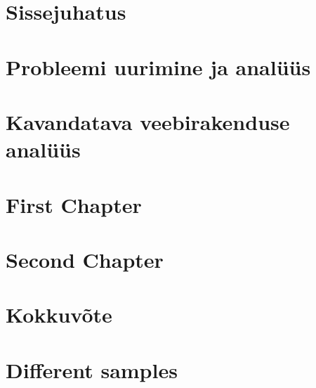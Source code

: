 \chapter{Sissejuhatus}\label{chapter:introduction}


\chapter{Probleemi uurimine ja analüüs}\label{chapter:theory}


\chapter{Kavandatava veebirakenduse analüüs}\label{chapter:analysis}


\chapter{First Chapter}\label{chapter:first_chapter}


\chapter{Second Chapter}\label{chapter:second_chapter}


\chapter{Kokkuvõte}\label{chapter:summary} 


\chapter{Different samples}\label{chapter:samples}
